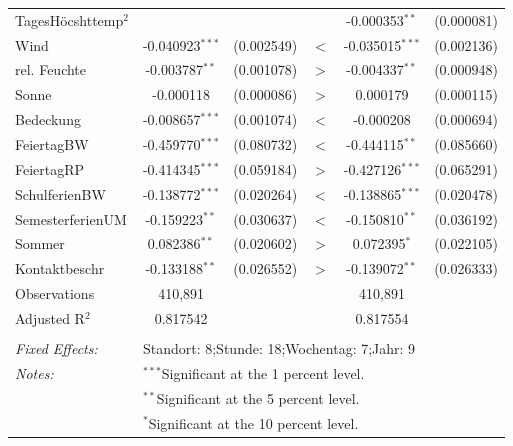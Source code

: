 \documentclass[a4paper,12pt]{thesis}
\begin{document}
\begin{table}[!htbp]
\begin{tabular}{@{\extracolsep{-5pt}}lccccc}
		TagesHöcshttemp$^2$ &  &  &  & -0.000353$^{**}$ & (0.000081)\\ 
		
		Wind & -0.040923$^{***}$ & (0.002549) & $<$ & -0.035015$^{***}$ & (0.002136)\\ 
		
		rel. Feuchte & -0.003787$^{**}$ & (0.001078) & $>$ & -0.004337$^{**}$ & (0.000948)\\ 
		
		Sonne & -0.000118 & (0.000086) & $>$ & 0.000179 & (0.000115)\\ 
		
		Bedeckung & -0.008657$^{***}$ & (0.001074) & $<$ & -0.000208 & (0.000694)\\ 
		
		FeiertagBW & -0.459770$^{***}$ & (0.080732) & $<$ & -0.444115$^{**}$ & (0.085660)\\ 
		
		FeiertagRP & -0.414345$^{***}$ & (0.059184) & $>$ & -0.427126$^{***}$ & (0.065291)\\ 
		
		SchulferienBW & -0.138772$^{***}$ & (0.020264) & $<$ & -0.138865$^{***}$ & (0.020478)\\ 
		
		SemesterferienUM & -0.159223$^{**}$ & (0.030637) & $<$ & -0.150810$^{**}$ & (0.036192)\\ 
		
		Sommer & 0.082386$^{**}$ & (0.020602) & $>$ & 0.072395$^{*}$ & (0.022105)\\ 
		
		Kontaktbeschr & -0.133188$^{**}$ & (0.026552) & $>$ & -0.139072$^{**}$ & (0.026333)\\ 
		
		Observations & 410,891 & & & 410,891 & \\ 
		Adjusted R$^{2}$ & 0.817542 & & & 0.817554 & \\  
		\hline \\[-1.8ex] 
		\textit{Fixed Effects:} & \multicolumn{5}{l}{Standort: 8;Stunde: 18;Wochentag: 7;Jahr: 9} \\ 
		\textit{Notes:} & \multicolumn{5}{l}{$^{***}$Significant at the 1 percent level.} \\ 
		& \multicolumn{5}{l}{$^{**}$Significant at the 5 percent level.} \\ 
		& \multicolumn{5}{l}{$^{*}$Significant at the 10 percent level.} \\ 
	\end{tabular} 
\end{table} 
\end{document}
